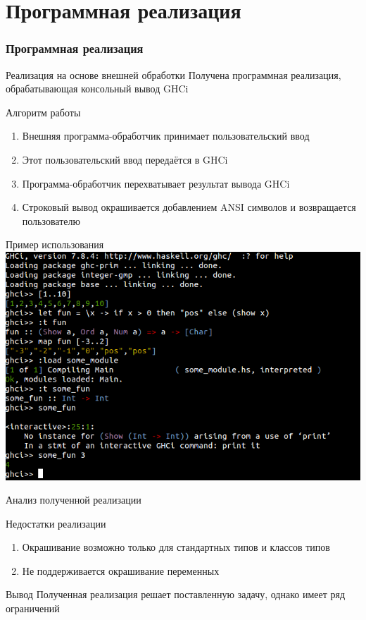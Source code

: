 \documentclass[utf8,russian]{beamer}
\begin{document}
\section{Программная реализация}
\begin{frame}
\frametitle{Программная реализация}

\begin{block}{Реализация на основе внешней обработки}
Получена программная реализация, обрабатывающая консольный вывод GHCi
\end{block}

\begin{block}{Алгоритм работы}
\begin{enumerate}
  \item Внешняя программа-обработчик принимает пользовательский ввод
  \item Этот пользовательский ввод передаётся в GHCi
  \item Программа-обработчик перехватывает результат вывода GHCi
  \item Строковый вывод окрашивается добавлением ANSI символов и возвращается пользователю
\end{enumerate}
\end{block}
\end{frame}
\begin{frame}{Пример использования}
\includegraphics[scale=0.5]{img/example.png}
\end{frame}


\begin{frame}{Анализ полученной реализации}

\begin{block}{Недостатки реализации}

  \begin{enumerate}
    \item Окрашивание возможно только для стандартных типов и классов типов
    \item Не поддерживается окрашивание переменных
  \end{enumerate}
\end{block}


\begin{block}{Вывод}
Полученная реализация решает поставленную задачу, однако имеет ряд ограничений
\end{block}

\end{frame}
\end{document}
